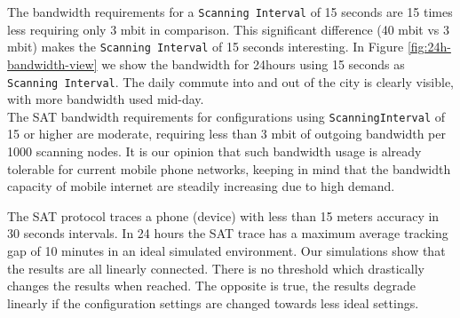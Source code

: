 \documentclass[10pt,titlepage]{article}
\begin{document}
The bandwidth requirements for a \texttt{Scanning Interval} of 15 seconds are 15 times less requiring only 3 mbit in comparison. This significant difference (40 mbit vs 3 mbit) makes the \texttt{Scanning Interval} of 15 seconds interesting. In Figure \ref{fig:24h-bandwidth-view} we show the bandwidth for 24hours using 15 seconds as \texttt{Scanning Interval}. The daily commute into and out of the city is clearly visible, with more bandwidth used mid-day.\\

The SAT bandwidth requirements for configurations using \texttt{ScanningInterval} of 15 or higher are moderate, requiring less than 3 mbit of outgoing bandwidth per 1000 scanning nodes. It is our opinion that such bandwidth usage is already tolerable for current mobile phone networks, keeping in mind that the bandwidth capacity of mobile internet are steadily increasing due to high demand.


The SAT protocol traces a phone (device) with less than 15 meters accuracy in 30 seconds intervals. In 24 hours the SAT trace has a maximum average tracking gap of 10 minutes in an ideal simulated environment. Our simulations show that the results are all linearly connected. There is no threshold which drastically changes the results when reached. The opposite is true, the results degrade linearly if the configuration settings are changed towards less ideal settings.

\end{document}
